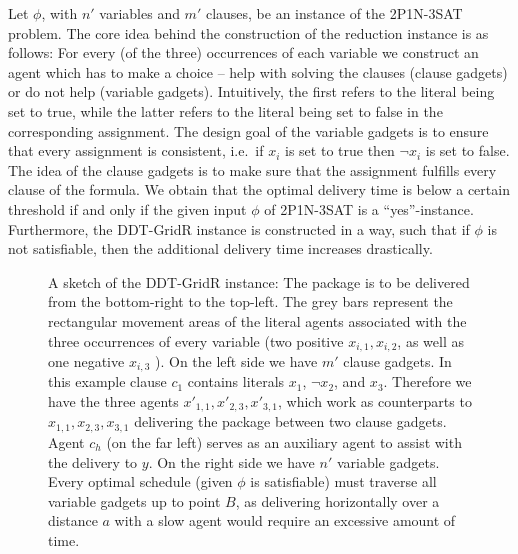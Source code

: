 Let $\phi$, with $n'$ variables and $m'$ clauses, be an instance of the \textsc{2P1N-3SAT} problem. 
The core idea behind the construction of the reduction instance is as follows: For every (of the three) occurrences of each variable we construct an agent which has to make a choice – help with solving the clauses (clause gadgets) or do not help (variable gadgets). Intuitively, the first refers to the literal being set to true, while the latter refers to the literal being set to false in the corresponding assignment.
The design goal of the variable gadgets is to ensure that every assignment is consistent, i.e.\ if $x_i$ is set to true then $\neg x_i$ is set to false. The idea of the clause gadgets is to make sure that the assignment fulfills every clause of the formula. We obtain that the optimal delivery time is below a certain threshold if and only if the given input $\phi$ of \textsc{2P1N-3SAT} is a ``yes''-instance. Furthermore, the DDT-GridR instance is constructed in a way, such that if $\phi$ is not satisfiable, then the additional delivery time increases drastically.


\begin{figure}[h!]
    \centering
    
    \caption{A sketch of the DDT-GridR instance: The package is to be delivered from the bottom-right to the top-left.  The grey bars represent the rectangular movement areas of the literal agents associated with the three occurrences of every variable (two positive $x_{i,1},x_{i,2}$, as well as one negative $x_{i,3}$ ). On the left side we have $m'$ clause gadgets. In this example clause $c_1$ contains literals $x_1$, $\neg x_2$, and $x_3$. Therefore we have the three agents $x'_{1,1},x'_{2,3},x'_{3,1}$, which work as counterparts to $x_{1,1},x_{2,3},x_{3,1}$ delivering the package between two clause gadgets. Agent $c_h$ (on the far left)  serves as an auxiliary agent to assist with the delivery to $y$. On the right side we have $n'$ variable gadgets. Every optimal schedule (given $\phi$ is satisfiable) must traverse all variable gadgets up to point $B$, as delivering horizontally over a distance $a$ with a slow agent would require an excessive amount of time.}
\label{fig:grid_2speed}
\end{figure}


